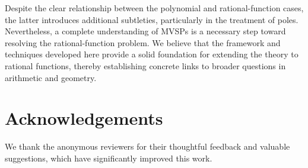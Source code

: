 \documentclass[11pt]{amsart}
\theoremstyle{definition}
\theoremstyle{remark}
\begin{document}
Despite the clear relationship between the polynomial and rational-function cases, the latter introduces additional subtleties, particularly in the treatment of poles. Nevertheless, a complete understanding of MVSPs is a necessary step toward resolving the rational-function problem. We believe that the framework and techniques developed here provide a solid foundation for extending the theory to rational functions, thereby establishing concrete links to broader questions in arithmetic and geometry.





\section*{Acknowledgements}
We thank the anonymous reviewers for their thoughtful feedback and valuable suggestions, which have significantly improved this work. 
\end{document}
